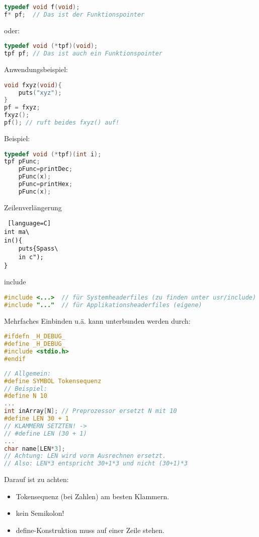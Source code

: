 \begin{multicols}{3}
\HRule[4pt]
\begin{lstlisting}[language=C]
typedef void f(void);
f* pf;	// Das ist der Funktionspointer
\end{lstlisting}
oder:
\begin{lstlisting}[language=C]
typedef void (*tpf)(void);
tpf pf;	// Das ist auch ein Funktionspointer
\end{lstlisting}
Anwendungsbeispiel:
\begin{lstlisting}[language=C]
void fxyz(void){
	puts("xyz");
}
pf = fxyz;
fxyz();
pf(); // ruft beides fxyz() auf!
\end{lstlisting}
Beispiel:
\begin{lstlisting}[language=C]
typedef void (*tpf)(int i);
tpf pFunc;
	pFunc=printDec;
	pFunc(x);
	pFunc=printHex;
	pFunc(x);
\end{lstlisting}
\HRule[4pt]
Zeilenverlängerung
\begin{lstlisting} [language=C]
int ma\
in(){
	puts{Spass\
	in c");
}
\end{lstlisting}

include

\begin{lstlisting}[language=C]
#include <...>	// für Systemheaderfiles (zu finden unter usr/include)
#include "..."	// für Applikationsheaderfiles (eigene)
\end{lstlisting}
Mehrfaches Einbinden u.ä. kann unterbunden werden durch:
\begin{lstlisting}[language=C]
#ifdefn _H_DEBUG_
#define _H_DEBUG_
#include <stdio.h>
#endif
\end{lstlisting}


\begin{lstlisting}[language = C]
// Allgemein:
#define SYMBOL Tokensequenz
// Beispiel:
#define N 10
...
int inArray[N];	// Preprozessor ersetzt N mit 10
#define LEN 30 + 1
// KLAMMERN SETZTEN! ->
// #define LEN (30 + 1)
...
char name[LEN*3];	
// Achtung: LEN wird vorm Ausrechnen ersetzt. 
// Also: LEN*3 entspricht 30+1*3 und nicht (30+1)*3
\end{lstlisting}

Darauf ist zu achten:
\begin{itemize}
\item Tokensequenz (bei Zahlen) am besten Klammern.
\item kein Semikolon!
\item define-Konstruktion muss auf einer Zeile stehen.
\end{itemize}


\end{multicols}
